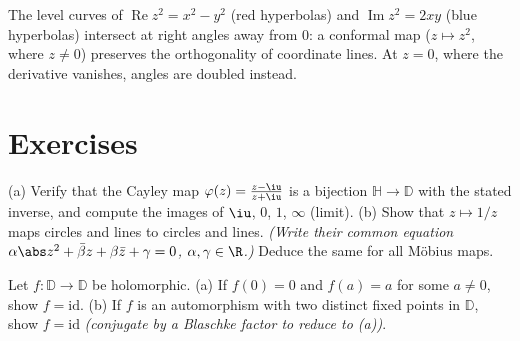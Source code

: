 \begin{omfigure}

{\small The level curves of $\operatorname{Re}z^2 = x^2 - y^2$
(red hyperbolas) and $\operatorname{Im}z^2 = 2xy$ (blue
hyperbolas) intersect at right angles away from $0$: a
conformal map ($z \mapsto z^2$, where $z \neq 0$) preserves
the orthogonality of coordinate lines. At $z = 0$, where the
derivative vanishes, angles are doubled instead.}
\end{omfigure}

\section{Exercises}

\begin{exercise}[$\star$]\label{exo:b3:conformal:1}
(a) Verify that the Cayley map $\varphi(z) = \frac{z -
\iu}{z + \iu}$ is a bijection $\mathbb H \to \mathbb D$ with
the stated inverse, and compute the images of $\iu$, $0$,
$1$, $\infty$ (limit).
(b) Show that $z \mapsto 1/z$ maps circles and lines to
circles and lines. \emph{(Write their common equation
$\alpha\abs z^2 + \bar\beta z + \beta\bar z + \gamma = 0$,
$\alpha, \gamma \in \R$.)} Deduce the same for all M\"obius
maps.
\end{exercise}

\begin{exercise}[$\star$]\label{exo:b3:conformal:2}
Let $f \colon \mathbb D \to \mathbb D$ be holomorphic.
(a) If $f(0) = 0$ and $f(a) = a$ for some $a \neq 0$, show $f
= \mathrm{id}$.
(b) If $f$ is an automorphism with two distinct fixed points
in $\mathbb D$, show $f = \mathrm{id}$
\emph{(conjugate by a Blaschke factor to reduce to (a))}.
\end{exercise}

